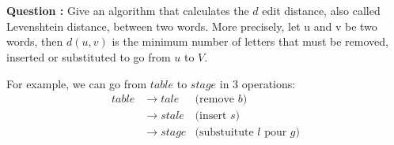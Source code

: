 \documentclass[11pt]{article} %
\newenvironment{question}[1][\unskip]{%
	\par
	\noindent
	\textbf{Question #1:}
	\noindent}
{\medskip}
\begin{document}
	\section{}
	\begin{question}
		Give an algorithm that calculates the $ d $ edit distance, also called Levenshtein distance, between two words. More precisely, let u and v be two words, then $ d (u, v) $ is the minimum number of letters that must be removed, inserted or substituted to go from $ u $ to $ V $.

		For example, we can go from $ table $ to $ stage $ in 3 operations:
		\begin{align*}
		table &\rightarrow tale & \text{(remove $b$)}\\
		&\rightarrow stale & \text{(insert $s$)}\\
		&\rightarrow stage & \text{(substuitute $l$ pour $g$)}
		\end{align*}
	\end{question}
\end{document}

